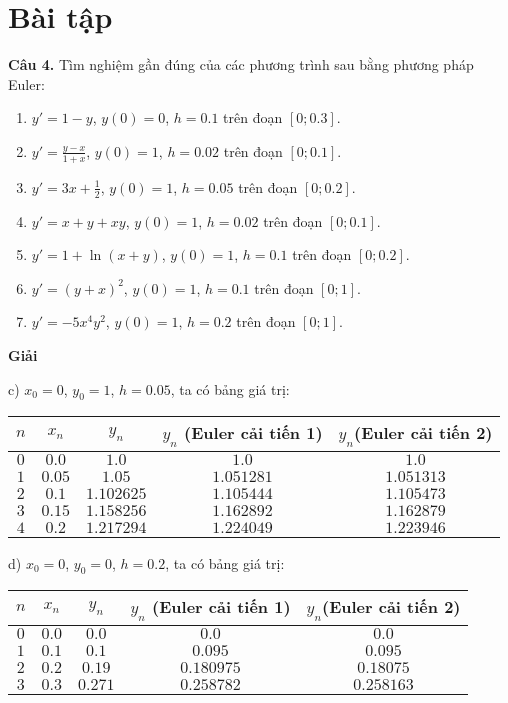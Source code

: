 \section{Bài tập}

\textbf{Câu 4.} Tìm nghiệm gần đúng của các phương trình sau bằng phương pháp Euler:
\begin{enumerate}[label=\alph*)]
	\item $y'=1-y$, $y(0)=0$, $h=0.1$ trên đoạn $[0;0.3]$.
	\item $y'=\frac{y-x}{1+x}$, $y(0)=1$, $h=0.02$ trên đoạn $[0;0.1]$.
	\item $y'=3x+\frac12$, $y(0)=1$, $h=0.05$ trên đoạn $[0;0.2]$.
	\item $y'=x+y+xy$, $y(0)=1$, $h=0.02$ trên đoạn $[0;0.1]$.
	\item $y'=1+\ln(x+y)$, $y(0)=1$, $h=0.1$ trên đoạn $[0;0.2]$.
	\item $y'=(y+x)^2$, $y(0)=1$, $h=0.1$ trên đoạn $[0;1]$.
	\item $y'=-5x^4y^2$, $y(0)=1$, $h=0.2$ trên đoạn $[0;1]$.
\end{enumerate}

\textbf{Giải}\par

c) $x_0=0$, $y_0=1$, $h=0.05$, ta có bảng giá trị:
\begin{longtable}{|c|c|c|c|c|}\hline
$n$ & $x_n$ & $y_n$ & $y_n$ (Euler cải tiến 1) & $y_n$(Euler cải tiến 2) \\ \hline
$0$ & $0.0$ & $1.0$ & $1.0$ & $1.0$ \\ \hline
$1$ & $0.05$ & $1.05$ & $1.051281$ & $1.051313$ \\ \hline
$2$ & $0.1$ & $1.102625$ & $1.105444$ & $1.105473$ \\ \hline
$3$ & $0.15$ & $1.158256$ & $1.162892$ & $1.162879$ \\ \hline
$4$ & $0.2$ & $1.217294$ & $1.224049$ & $1.223946$ \\ \hline
\end{longtable}
d) $x_0=0$, $y_0=0$, $h=0.2$, ta có bảng giá trị:

\begin{longtable}{|c|c|c|c|c|}\hline
	$n$ & $x_n$ & $y_n$ & $y_n$ (Euler cải tiến 1) & $y_n$(Euler cải tiến 2) \\ \hline
	\endhead
	$0$ & $0.0$ & $0.0$ & $0.0$ & $0.0$ \\ \hline
	$1$ & $0.1$ & $0.1$ & $0.095$ & $0.095$ \\ \hline
	$2$ & $0.2$ & $0.19$ & $0.180975$ & $0.18075$ \\ \hline
	$3$ & $0.3$ & $0.271$ & $0.258782$ & $0.258163$ \\ \hline
\end{longtable}

